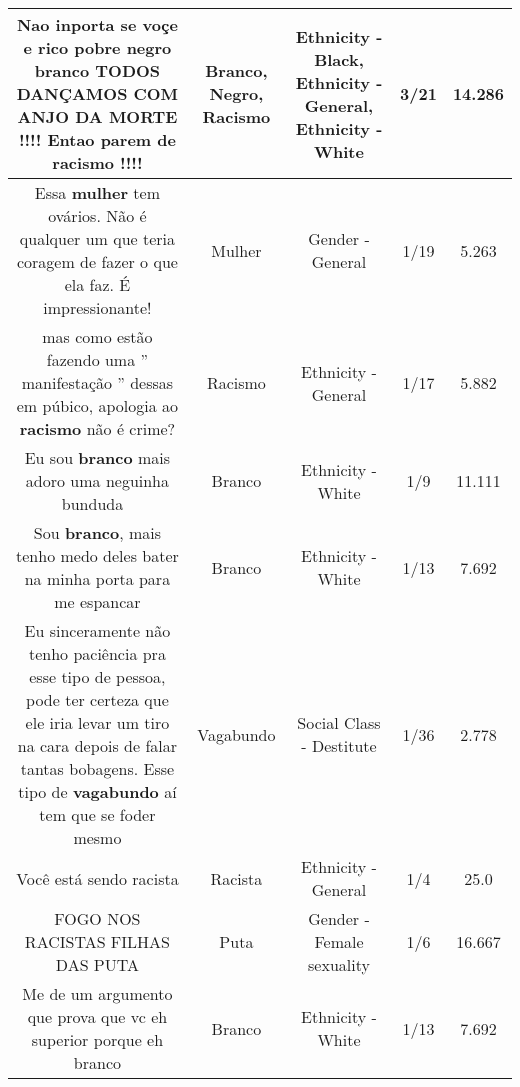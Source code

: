 \documentclass[11pt]{article}
\newlength\mylength
\begin{document}
\begin{center}
\begin{longtable}{|C{.65\mylength}|C{.30\mylength}|C{.12\mylength}|C{.12\mylength}|C{.12\mylength}|}
  \small Nao inporta se voçe e rico pobre \textbf{negro} \textbf{branco} TODOS DANÇAMOS COM ANJO DA MORTE !!!! Entao parem de \textbf{racismo} !!!!\normalsize   & Branco, Negro, Racismo & Ethnicity - Black, Ethnicity - General, Ethnicity - White & 3/21 & 14.286 \\  \hline
  \small Essa \textbf{mulher} tem ovários. Não é qualquer um que teria coragem de fazer o que ela faz. É impressionante!\normalsize   & Mulher & Gender - General & 1/19 & 5.263 \\  \hline
  \small mas como estão fazendo uma  '' manifestação '' dessas em púbico, apologia ao \textbf{racismo} não é crime?\normalsize   & Racismo & Ethnicity - General & 1/17 & 5.882 \\  \hline
  \small Eu sou \textbf{branco} mais adoro uma neguinha bunduda 💙\normalsize   & Branco & Ethnicity - White & 1/9 & 11.111 \\  \hline
  \small Sou \textbf{branco}, mais tenho medo deles bater na minha porta para me espancar\normalsize   & Branco & Ethnicity - White & 1/13 & 7.692 \\  \hline
  \small Eu sinceramente não tenho paciência pra esse tipo de pessoa, pode ter certeza que ele iria levar um tiro na cara depois de falar tantas bobagens. Esse tipo de \textbf{vagabundo} aí tem que se foder mesmo\normalsize   & Vagabundo & Social Class - Destitute & 1/36 & 2.778 \\  \hline
  \small Você está sendo racista\normalsize   & Racista & Ethnicity - General & 1/4 & 25.0 \\  \hline
  \small FOGO NOS RACISTAS FILHAS DAS PUTA\normalsize   & Puta & Gender - Female sexuality & 1/6 & 16.667 \\  \hline
  \small Me de um argumento que prova que vc eh superior porque eh branco\normalsize   & Branco & Ethnicity - White & 1/13 & 7.692 \\  \hline

\end{longtable}
\end{center}
\end{document}
